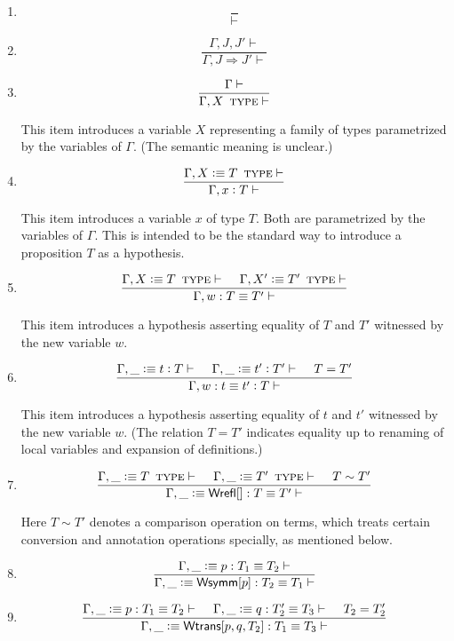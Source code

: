 \documentclass[11pt]{article}
\newcommand{\eqd}{\equiv}
\newcommand{\spc}{{\,\,\,\,\,\,\,}}
\newcommand{\ccolon}[1]{\vcentcolon#1}
\newcommand{\ccheck}[1]{\vcentcolon#1}  %
\newcommand{\synth}[1]{\vcentcolon(\Rightarrow#1)} %
\renewcommand{\synth}[1]{\ccheck#1} %
\newcommand{\Type}{\mathop{\text{ \sc type}}}
\newcommand{\Okay}{\mathop{\text{ \sc okay}}}
\newcommand{\Context}{\vdash\Okay}
\renewcommand{\Context}{\vdash}
\newcommand{\ha}[2]{#1[#2]}
\newcommand{\Wrefl}{{\sf Wrefl}}
\newcommand{\Wtrans}{{\sf Wtrans}}
\newcommand{\Wsymm}{{\sf Wsymm}}
\newcommand{\var}{\char`_}
\newcommand{\defn}{\vcentcolon\equiv}
\begin{document}
\begin{enumerate}

\item
$$\frac{}{\Context}$$

\item
$$\frac{\Gamma,J,J'\Context}{\Gamma,J \Rightarrow J' \Context}$$

\item
$$\frac{\Gamma\Context}{\Gamma, X \Type \Context}$$

This item introduces a variable $X$ representing a family of types parametrized
by the variables of $\Gamma$.  (The semantic meaning is unclear.)

\item
$$\frac{\Gamma, X \defn T \Type \Context}{\Gamma, x \ccolon{T} \Context}$$

This item introduces a variable $x$ of type $T$.  Both are parametrized by the
variables of $\Gamma$.  This is intended to be the standard way to introduce a
proposition $T$ as a hypothesis.

\item
$$\frac{
  \Gamma, X \defn T \Type\Context  
  \spc
  \Gamma, X' \defn T' \Type\Context }
{\Gamma, w : T \eqd T' \Context}$$

This item introduces a hypothesis asserting equality of $T$ and $T'$ witnessed
by the new variable $w$.


\item
  \[\frac{
  \Gamma, \var \defn t \synth{T} \Context
  \spc
  \Gamma, \var \defn t' \synth{T'} \Context
  \spc
  T = T'
  } {
  \Gamma, w : t \eqd t' \ccolon{T} \Context}\]

This item introduces a hypothesis asserting equality of $t$ and $t'$ witnessed
by the new variable $w$.  (The relation $T = T'$ indicates equality up to
renaming of local variables and expansion of definitions.)

\item 
\[\frac{\Gamma, \var \defn T \Type \Context \spc \Gamma, \var \defn T'\Type \Context
  \spc T\sim T'}{
  \Gamma, \var \defn \ha\Wrefl{}: T\eqd T' \Context
}
\]

Here $T\sim T'$ denotes a comparison operation on terms, which treats certain
conversion and annotation operations specially, as mentioned below.

\item 
$$\frac{\Gamma,\var\defn p:T_1\eqd T_2 \Context }{\Gamma, \var\defn \ha\Wsymm{p}:T_2\eqd T_1 \Context}$$

\item 
\[
  \frac{
    \Gamma, \var \defn p:T_1\eqd T_2 \Context
    \spc
    \Gamma, \var \defn q:T'_2\eqd T_3 \Context
    \spc
    T_2=T_2'}
  {\Gamma, \var \defn \ha\Wtrans{p,q,T_2}: T_1\eqd T_3 \Context}
\]


\end{enumerate}
\end{document}
